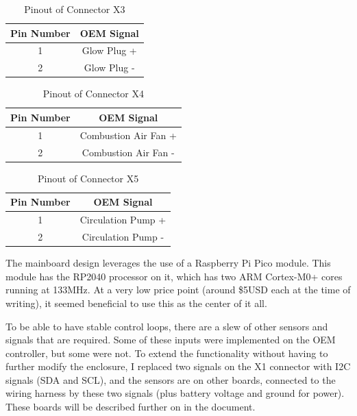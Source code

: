 \documentclass[lettersize,journal]{IEEEtran}
\begin{document}
\begin{table}
\begin{center}
\caption{Pinout of Connector X3}
\label{pinout-x3}
\begin{tabular}{| c | c |}
\hline
Pin Number & OEM Signal \\
\hline
1 & Glow Plug + \\
\hline
2 & Glow Plug - \\
\hline
\end{tabular}
\end{center}
\end{table}

\begin{table}
\begin{center}
\caption{Pinout of Connector X4}
\label{pinout-x4}
\begin{tabular}{| c | c |}
\hline
Pin Number & OEM Signal \\
\hline
1 & Combustion Air Fan + \\
\hline
2 & Combustion Air Fan - \\
\hline
\end{tabular}
\end{center}
\end{table}

\begin{table}
\begin{center}
\caption{Pinout of Connector X5}
\label{pinout-x5}
\begin{tabular}{| c | c |}
\hline
Pin Number & OEM Signal \\
\hline
1 & Circulation Pump + \\
\hline
2 & Circulation Pump - \\
\hline
\end{tabular}
\end{center}
\end{table}

The mainboard design leverages the use of a Raspberry Pi Pico module.  This module has the RP2040 processor on it, which has two ARM Cortex-M0+ cores running at 133MHz.  At a very low price point (around \$5USD each at the time of writing), it seemed beneficial to use this as the center of it all.

To be able to have stable control loops, there are a slew of other sensors and signals that are required.  Some of these inputs were implemented on the OEM controller, but some were not.  To extend the functionality without having to further modify the enclosure, I replaced two signals on the X1 connector with I2C signals (SDA and SCL), and the sensors are on other boards, connected to the wiring harness by these two signals (plus battery voltage and ground for power).  These boards will be described further on in the document.
\end{document}
